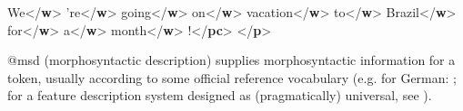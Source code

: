 \begin{reflist}
\begin{sansreflist}
\begin{reflist}
We{</\textbf{w}>}\mbox{}\newline 
{}'re{</\textbf{w}>}\mbox{}\newline 
{}going{</\textbf{w}>}\mbox{}\newline 
{}on{</\textbf{w}>}\mbox{}\newline 
{}vacation{</\textbf{w}>}\mbox{}\newline 
{}to{</\textbf{w}>}\mbox{}\newline 
{}Brazil{</\textbf{w}>}\mbox{}\newline 
{}for{</\textbf{w}>}\mbox{}\newline 
{}a{</\textbf{w}>}\mbox{}\newline 
{}month{</\textbf{w}>}\mbox{}\newline 
{}!{</\textbf{pc}>}\mbox{}\newline 
{</\textbf{p}>}
\end{reflist}  
    \item[@msd]
  (morphosyntactic description) supplies morphosyntactic information for a token, usually according to some official reference vocabulary (e.g. for German: ; for a feature description system designed as (pragmatically) universal, see ).

\end{sansreflist}
\end{reflist}
